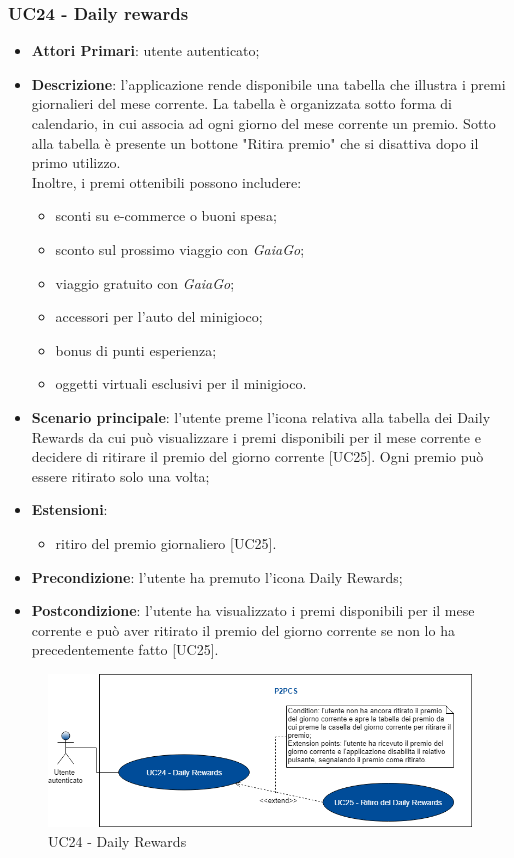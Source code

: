 
\subsubsection{UC24 - Daily rewards}
\begin{itemize}
	\item \textbf{Attori Primari}: utente autenticato;
	\item \textbf{Descrizione}: l'applicazione rende disponibile una tabella che illustra i premi giornalieri del mese corrente. La tabella è organizzata sotto forma di calendario, in cui associa ad ogni giorno del mese corrente un premio.
	Sotto alla tabella è presente un bottone "Ritira premio" che si disattiva dopo il primo utilizzo.\\
	Inoltre, i premi ottenibili possono includere:
	\begin{itemize}
		\item sconti su e-commerce o buoni spesa;
		\item sconto sul prossimo viaggio con \textit{GaiaGo};
		\item viaggio gratuito con \textit{GaiaGo};
		\item accessori per l'auto del minigioco;
		\item bonus di punti esperienza;
		\item oggetti virtuali esclusivi per il minigioco.
	\end{itemize}
	\item \textbf{Scenario principale}: l'utente preme l'icona relativa alla tabella dei Daily Rewards da cui può visualizzare i premi disponibili per il mese corrente e decidere di ritirare il premio del giorno corrente [UC25].
	Ogni premio può essere ritirato solo una volta;
	\item \textbf{Estensioni}: 
		\begin{itemize}
			\item ritiro del premio giornaliero [UC25].
		\end{itemize}
	\item \textbf{Precondizione}: l'utente ha premuto l'icona Daily Rewards;
	\item \textbf{Postcondizione}: l'utente ha visualizzato i premi disponibili per il mese corrente e può aver ritirato il premio del giorno corrente se non lo ha precedentemente fatto [UC25]. 
\end{itemize} 
\begin{figure}[h]
	\includegraphics[width=13.2cm]{res/images/UC24Daily.png}
	\centering
	\caption{UC24 - Daily Rewards}
\end{figure}
